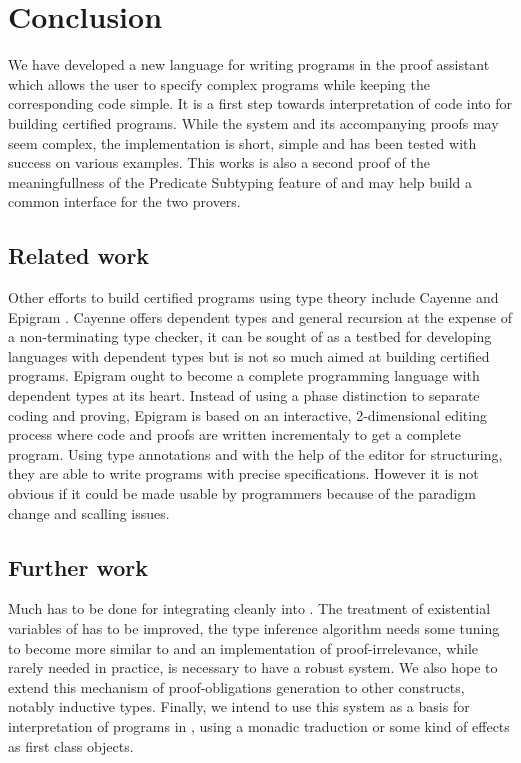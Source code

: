 \documentclass{llncs}
\begin{document}
\section{Conclusion}
We have developed a new language for writing programs in the \Coq proof
assistant which allows the user to specify complex programs while
keeping the corresponding code simple. It is a first step towards
interpretation of \ML code into \Coq for building certified
programs. While the system and its accompanying proofs may seem complex, the
implementation is short, simple and has been tested with success on
various examples. This works is also a second proof of the
meaningfullness of the Predicate Subtyping feature of \PVS{} and may
help build a common interface for the two provers. 

\subsection{Related work}
Other efforts to build certified programs using type theory include
Cayenne \cite{Augustsson99} and Epigram
\cite{DBLP:journals/jfp/McBrideM04}. Cayenne offers dependent
types and general recursion at the expense of a non-terminating type
checker, it can be sought of as a testbed for developing languages with
dependent types but is not so much aimed at building certified programs.
Epigram ought to become a complete programming language with dependent
types at its heart. Instead of using a phase distinction to separate
coding and proving, Epigram is based on an interactive, 2-dimensional editing process
where code and proofs are written incrementaly to get a complete program.
Using type annotations and with the help of the editor for structuring, 
they are able to write programs with precise specifications. However it
is not obvious if it could be made usable by programmers because of the
paradigm change and scalling issues. 

\subsection{Further work}
Much has to be done for integrating \Russell cleanly into \Coq. The
treatment of existential variables of \Coq has to be improved, the
type inference algorithm needs some tuning to become more similar to \ML
and an implementation of proof-irrelevance, while rarely needed in
practice, is necessary to have a robust system.
We also hope to extend this mechanism of proof-obligations generation to other
constructs, notably inductive types. Finally, we intend to use this system as a
basis for interpretation of \ML{} programs in \Coq, using a monadic
traduction or some kind of effects as first class objects.




\renewcommand{\thefootnote}{}
\end{document}
